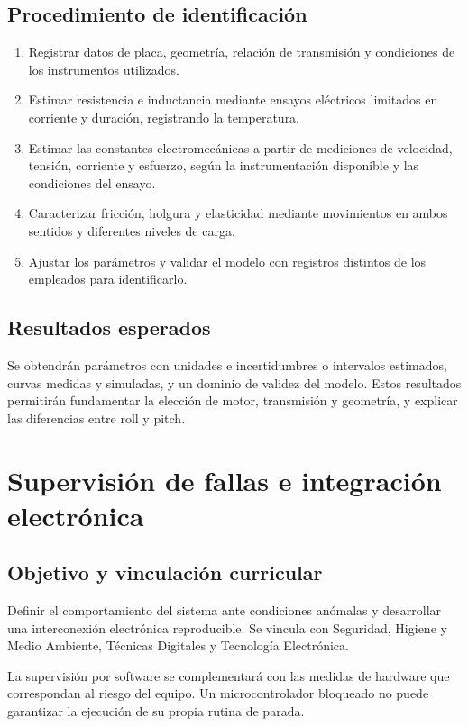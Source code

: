 \documentclass[11pt,a4paper]{article}
\begin{document}
\subsection{Procedimiento de identificación}
\begin{enumerate}
    \item Registrar datos de placa, geometría, relación de transmisión y
    condiciones de los instrumentos utilizados.
    \item Estimar resistencia e inductancia mediante ensayos eléctricos
    limitados en corriente y duración, registrando la temperatura.
    \item Estimar las constantes electromecánicas a partir de mediciones
    de velocidad, tensión, corriente y esfuerzo, según la instrumentación
    disponible y las condiciones del ensayo.
    \item Caracterizar fricción, holgura y elasticidad mediante movimientos
    en ambos sentidos y diferentes niveles de carga.
    \item Ajustar los parámetros y validar el modelo con registros distintos
    de los empleados para identificarlo.
\end{enumerate}

\subsection{Resultados esperados}
Se obtendrán parámetros con unidades e incertidumbres o intervalos estimados,
curvas medidas y simuladas, y un dominio de validez del modelo. Estos
resultados permitirán fundamentar la elección de motor, transmisión y
geometría, y explicar las diferencias entre roll y pitch.

\setcounter{section}{6}
\section{Supervisión de fallas e integración electrónica}

\subsection{Objetivo y vinculación curricular}
Definir el comportamiento del sistema ante condiciones anómalas y desarrollar
una interconexión electrónica reproducible. Se vincula con Seguridad,
Higiene y Medio Ambiente, Técnicas Digitales y Tecnología Electrónica.

La supervisión por software se complementará con las medidas de hardware
que correspondan al riesgo del equipo. Un microcontrolador bloqueado no
puede garantizar la ejecución de su propia rutina de parada.
\end{document}
